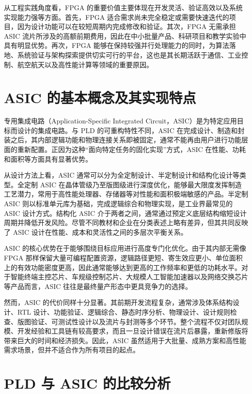 从工程实践角度看，FPGA
的重要价值主要体现在开发灵活、验证高效以及系统实现能力强等方面。首先，FPGA
适合需求尚未完全稳定或需要快速迭代的项目，因为设计功能可以在较短周期内完成修改和验证。其次，FPGA
无需承担 ASIC
流片所涉及的高额前期费用，因此在中小批量产品、科研项目和教学实验中具有明显优势。再次，FPGA
能够在保持较强并行处理能力的同时，为算法落地、系统验证与架构探索提供切实可行的平台，这也是其长期活跃于通信、工业控制、航空航天以及高性能计算等领域的重要原因。

\section{ASIC
的基本概念及其实现特点}\label{asic-ux7684ux57faux672cux6982ux5ff5ux53caux5176ux5b9eux73b0ux7279ux70b9}

专用集成电路（Application-Specific Integrated
Circuit，ASIC）是为特定应用目标而设计的集成电路。与 PLD
的可重构特性不同，ASIC
在完成设计、制造和封装之后，其内部逻辑功能和物理连接关系即被固定，通常不能再由用户进行功能层面的重新配置。正因为这种``面向特定任务的固化实现''方式，ASIC
在性能、功耗和面积等方面具有显著优势。

从设计方法上看，ASIC
通常可以分为全定制设计、半定制设计和结构化设计等类型。全定制 ASIC
在晶体管级乃至版图级进行深度优化，能够最大限度发挥制造工艺潜力，常用于高性能处理器、存储器等对性能和面积极端敏感的产品。半定制
ASIC 则以标准单元库为基础，完成逻辑综合和物理实现，是工业界最常见的 ASIC
设计方式。结构化 ASIC
介于两者之间，通常通过预定义底层结构缩短设计周期并降低开发风险。尽管不同教材和企业在分类表述上略有差异，但其共同反映了
ASIC 设计在性能、成本和灵活性之间的多层次平衡关系。

ASIC 的核心优势在于能够围绕目标应用进行高度专门化优化。由于其内部无需像
FPGA
那样保留大量可编程配置资源，逻辑路径更短、寄生效应更小、单位面积上的有效功能密度更高，因此通常能够达到更高的工作频率和更低的功耗水平。对于智能终端主控芯片、车规级控制芯片、大规模人工智能加速器以及网络交换芯片等产品而言，ASIC
往往是最终量产形态中更具竞争力的选择。

然而，ASIC
的代价同样十分显著。其前期开发流程复杂，通常涉及体系结构设计、RTL
设计、功能验证、逻辑综合、静态时序分析、物理设计、设计规则检查、版图验证、可测试性设计以及流片与封测等多个环节。整个流程不仅对团队规模、开发经验和工具链有较高要求，而且一旦设计错误在流片后暴露，重新修版将带来巨大的时间和经济损失。因此，ASIC
虽然适用于大批量、成熟方案和高性能需求场景，但并不适合作为所有项目的起点。

\section{PLD 与 ASIC
的比较分析}\label{pld-ux4e0e-asic-ux7684ux6bd4ux8f83ux5206ux6790}

